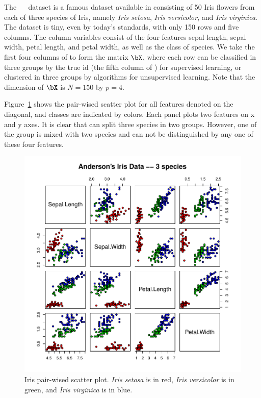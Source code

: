 The ~\citep{Fisher1936}~ dataset is a famous dataset
available in 
consisting of 50 Iris flowers from each of three species of Iris,
namely {\it Iris setosa}, {\it Iris versicolor}, and {\it Iris virginica}.
The dataset is tiny, even by today's standards, with only 150 rows and five
columns. The column variables consist of the
four features sepal length, sepal width, petal length, and petal width,
as well as the class of species.
We take the first four columns of  to form the matrix $\bX$, 
where each row can be
classified in three groups by the true id (the fifth column of )
for supervised learning,
or clustered in three groups by algorithms for unsupervised learning.
Note that the dimension of $\bX$ is $N = 150$ by $p = 4$.

Figure~\ref{fig:iris_pairs} shows the pair-wised scatter plot for all features
denoted on the diagonal, and classes are indicated by colors. Each panel
plots two features on x and y axes. It is clear
that  can split three species in two groups. However,
one of the group is mixed with two species and can not be distinguished by
any one of these four features.
\begin{figure}[h!bt]
  \centering
  \includegraphics[width=6.5in]{pbdDEMO-include/pics/iris_pairs.pdf}
  \vspace{-1.5cm}
  \caption[Iris pair-wised scatter plot]{
    Iris pair-wised scatter plot. {\it Iris setosa} is in red,
    {\it Iris versicolor} is in green, and {\it Iris virginica} is in blue.
  }
  \label{fig:iris_pairs}
\end{figure}


